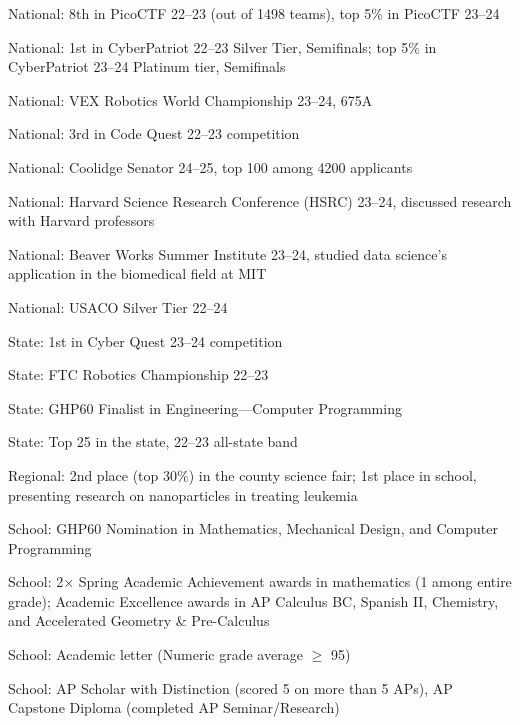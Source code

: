 \documentclass[sidebar-width=2in, primary=slate, linespace=1.2]{clean-resume}
\begin{document}
    \begin{lst}
        \item National: 8th in PicoCTF 22--23 (out of 1498 teams), top 5\% in PicoCTF 23--24
        \item National: 1st in CyberPatriot 22--23 Silver Tier, Semifinals; top 5\% in CyberPatriot 23--24 Platinum tier, Semifinals
        \item National: VEX Robotics World Championship 23--24, 675A
        \item National: 3rd in Code Quest 22--23 competition
        \item National: Coolidge Senator 24--25, top 100 among 4200 applicants
        \item National: Harvard Science Research Conference (HSRC) 23--24, discussed research with Harvard professors
        \item National: Beaver Works Summer Institute 23--24, studied data science's application in the biomedical field at MIT
        \item National: USACO Silver Tier 22--24
        \item State: 1st in Cyber Quest 23--24 competition
        \item State: FTC Robotics Championship 22--23
        \item State: GHP60 Finalist in Engineering---Computer Programming
        \item State: Top 25 in the state, 22--23 all-state band
        \item Regional: 2nd place (top 30\%) in the county science fair; 1st place in school, presenting research on nanoparticles in treating leukemia
        \item School: GHP60 Nomination in Mathematics, Mechanical Design, and Computer Programming
        \item School: 2× Spring Academic Achievement awards in mathematics (1 among entire grade); Academic Excellence awards in AP Calculus BC, Spanish II, Chemistry, and Accelerated Geometry \& Pre-Calculus
        \item School: Academic letter (Numeric grade average $\ge$ 95)
        \item School: AP Scholar with Distinction (scored 5 on more than 5 APs), AP Capstone Diploma (completed AP Seminar/Research)
    \end{lst}
\end{document}
